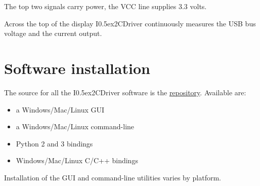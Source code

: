 \documentclass{article}
\newcommand{\two}{\raise0.5ex\hbox{\footnotesize{2}}}
\newcommand{\iicdriver}{I\two{}CDriver}
\begin{document}
The top two signals carry power, the VCC line supplies 3.3 volts.

Across the top of the display \iicdriver{} continuously measures the USB bus voltage
and the current output.

\newpage
\section{Software installation}

The source for all the \iicdriver{} software is the
\href{https://github.com/jamesbowman/i2cdriver}{repository}.
Available are:

\begin{itemize}
\item a Windows/Mac/Linux GUI
\item a Windows/Mac/Linux command-line
\item Python 2 and 3 bindings
\item Windows/Mac/Linux C/C++ bindings
\end{itemize}

Installation of the GUI and command-line utilities varies by platform.
\end{document}
